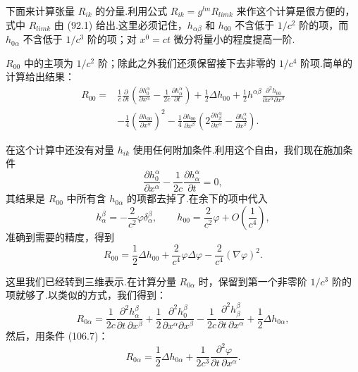 下面来计算张量 $R_{ik}$ 的分量.利用公式 $R_{ik}=g^{lm}R_{limk}$ 来作这个计算是很方便的，式中 $R_{limk}$ 由 (92.1) 给出.这里必须记住，$h_{\alpha\beta}$ 和 $h_{00}$ 不含低于 $1/c^{2}$ 阶的项，而 $h_{0\alpha}$ 不含低于 $1/c^{3}$ 阶的项；对 $x^{0}=ct$ 微分将量小的程度提高一阶.

$R_{00}$ 中的主项为 $1/c^{2}$ 阶；除此之外我们还须保留接下去非零的 $1/c^{4}$ 阶项.简单的计算给出结果：
\begin{equation*}
\begin{aligned}
  R_{00}={}&\frac{1}{c}\frac{\partial}{\partial t}
  \left(\frac{\partial h_0^{\alpha}}{\partial x^{\alpha}}
  -\frac{1}{2c}\frac{\partial h_{\alpha}^{\alpha}}{\partial t}\right)
  +\frac{1}{2}\Delta h_{00}
  +\frac{1}{2}h^{\alpha\beta}
  \frac{\partial^{2}h_{00}}{\partial x^{\alpha}\partial x^{\beta}}\\
  &-\frac{1}{4}\left(\frac{\partial h_{00}}{\partial x^{\alpha}}\right)^{2}
  -\frac{1}{4}\frac{\partial h_{00}}{\partial x^{\beta}}
  \left(2\frac{\partial h_{\beta}^{\alpha}}{\partial x^{\alpha}}
  -\frac{\partial h_{\alpha}^{\alpha}}{\partial x^{\beta}}\right).
\end{aligned}
\end{equation*}

在这个计算中还没有对量 $h_{ik}$ 使用任何附加条件.利用这个自由，我们现在施加条件
\begin{equation}
  \frac{\partial h_0^{\alpha}}{\partial x^{\alpha}}
  -\frac{1}{2c}\frac{\partial h_{\alpha}^{\alpha}}{\partial t}=0,
\end{equation}
其结果是 $R_{00}$ 中所有含 $h_{0\alpha}$ 的项都去掉了.在余下的项中代入
\begin{equation*}
  h_{\alpha}^{\beta}=-\frac{2}{c^{2}}\varphi\delta_{\alpha}^{\beta},
  \qquad
  h_{00}=\frac{2}{c^{2}}\varphi
  +O\left(\frac{1}{c^{4}}\right),
\end{equation*}
准确到需要的精度，得到
\begin{equation}
  R_{00}=\frac{1}{2}\Delta h_{00}
  +\frac{2}{c^{4}}\varphi\Delta\varphi
  -\frac{2}{c^{4}}(\nabla\varphi)^{2}.
\end{equation}

这里我们已经转到三维表示.在计算分量 $R_{0\alpha}$ 时，保留到第一个非零阶 $1/c^{3}$ 阶的项就够了.以类似的方式，我们得到：
\begin{equation*}
  R_{0\alpha}
  =\frac{1}{2c}\frac{\partial^{2}h_{\alpha}^{\beta}}
  {\partial t\,\partial x^{\beta}}
  +\frac{1}{2}\frac{\partial^{2}h_0^{\beta}}
  {\partial x^{\alpha}\partial x^{\beta}}
  -\frac{1}{2c}\frac{\partial^{2}h_{\beta}^{\beta}}
  {\partial t\,\partial x^{\alpha}}
  +\frac{1}{2}\Delta h_{0\alpha},
\end{equation*}
然后，用条件 (106.7)：
\begin{equation}
  R_{0\alpha}=\frac{1}{2}\Delta h_{0\alpha}
  +\frac{1}{2c^{3}}\frac{\partial^{2}\varphi}
  {\partial t\,\partial x^{\alpha}}.
\end{equation}

